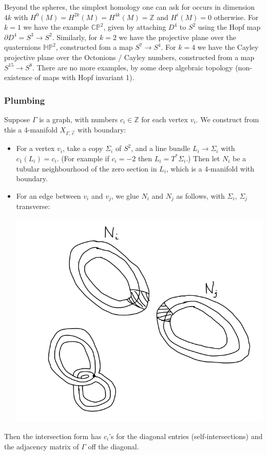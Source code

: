 \documentclass{article}
\theoremstyle{definition}
\newcommand{\CP}{\mathbb{CP}}
\newcommand{\HP}{\mathbb{HP}}
\newcommand{\Z}{\mathbb{Z}}
\begin{document}
Beyond the spheres, the simplest homology one can ask for occurs in dimension
$4k$ with $H^0(M)=H^{2k}(M)=H^{4k}(M)=\Z$ and $H^i(M)=0$ otherwise. For $k=1$ we
have the example $\CP^2$, given by attaching $D^4$ to $S^2$ using the Hopf map
$\partial D^4=S^3\to S^2$. Similarly, for $k=2$ we have the projective plane
over the quaternions $\HP^2$, constructed fom a map $S^7\to S^4$. For $k=4$ we
have the Cayley projective plane over the Octonions / Cayley numbers,
constructed from a map $S^{15}\to S^8$. There are no more examples, by some deep
algebraic topology (non-existence of maps with Hopf invariant 1).

\subsubsection*{Plumbing}

Suppose $\Gamma$ is a graph, with numbers $c_i\in\Z$ for each vertex $v_i$. We
construct from this a 4-manifold $X_{\Gamma,\vec c}$ with boundary:
\begin{itemize}
    \item For a vertex $v_i$, take a copy $\Sigma_i$ of $S^2$, and a line bundle
        $L_i\to\Sigma_i$ with $c_1(L_i)=c_i$. (For example if $c_i=-2$ then
        $L_i=T^*\Sigma_i$.) Then let $N_i$ be a tubular neighbourhood of the
        zero section in $L_i$, which is a 4-manifold with boundary.

    \item For an edge between $v_i$ and $v_j$, we glue $N_i$ and $N_j$ as
        follows, with $\Sigma_i$, $\Sigma_j$ transverse:
        \begin{center}
            \includegraphics[scale=0.4]{manifolds_plumbing}
        \end{center}
\end{itemize}
Then the intersection form has $c_i$'s for the diagonal entries
(self-intersections) and the adjacency matrix of $\Gamma$ off the diagonal.
\end{document}
